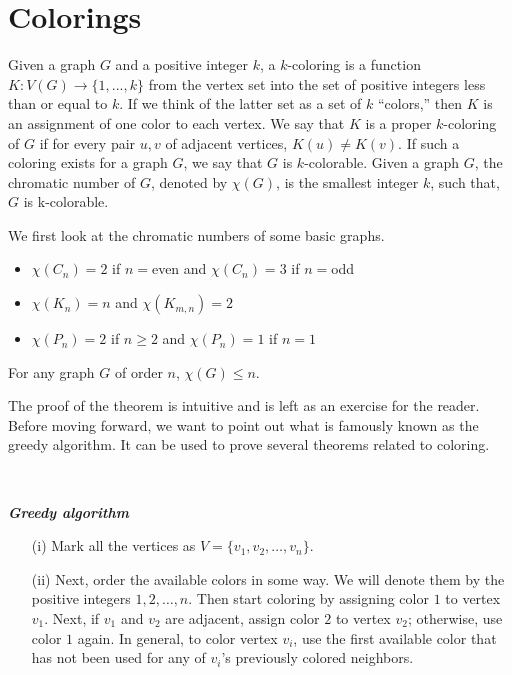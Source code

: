 \documentclass[../basic_graph_theory.tex]{subfiles}
\begin{document}
\chapter{Colorings}
\setcounter{chapter}{7} %
\setcounter{section}{0}
\setcounter{equation}{0}
\setcounter{figure}{0}

Given a graph $G$ and a positive integer $k$, a $k$-coloring is a function $K : V (G) \to \{1,...,k\}$ from the vertex set into the set of positive integers less than or equal to $k$. If we think of the latter set as a set of $k$ “colors,” then $K$ is an assignment of one color to each vertex. We say that $K$ is a proper $k$-coloring of $G$ if for every pair $u,v$ of adjacent vertices, $K(u) \neq K(v)$. If such a coloring exists for a graph $G$, we say that $G$ is $k$-colorable. Given a graph $G$, the chromatic number of $G$, denoted by $\chi(G)$, is the smallest integer $k$, such that, $G$ is k-colorable.

We first look at the chromatic numbers of some basic graphs.\\
\begin{itemize}
\item $\chi(C_n)=2$ if $n=$even and $\chi(C_n)=3$ if $n=$odd\\
\item $\chi(K_n)=n$ and $\chi(K_{m,n})=2$\\
\item $\chi(P_n)=2$ if $n \ge 2$ and $\chi(P_n)=1$ if $n=1$
\end{itemize}

\begin{Thm}{}{}
    For any graph $G$ of order $n$, $\chi(G) \le n$.
\end{Thm}
The proof of the theorem is intuitive and is left as an exercise for the reader.\\
Before moving forward, we want to point out what is famously known as the greedy algorithm. It can be used to prove several theorems related to coloring.

\

\textbf{\textit{Greedy algorithm}}
\begin{enumerate}
    \item[(i)] Mark all the vertices as $V=\{v_1, v_2, \dots, v_n\}$.
    \item[(ii)] Next, order the available colors in some way. We will denote them by the positive integers $1,2,\dots,n$. Then start coloring by assigning color $1$ to vertex $v_1$. Next, if $v_1$ and $v_2$ are adjacent, assign color $2$ to vertex $v_2$; otherwise, use color $1$ again. In general, to color vertex $v_i$, use the first available color that has not been used for any of $v_i$'s previously colored neighbors.
\end{enumerate}
\end{document}
